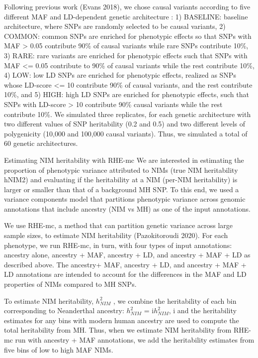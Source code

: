 Following previous work (Evans 2018), we chose causal variants according to five different MAF and LD-dependent genetic architecture : 1) BASELINE: baseline architecture, where SNPs are randomly selected to be causal variants, 2) COMMON: common SNPs are enriched for phenotypic effects so that SNPs with MAF > 0.05 contribute 90\% of causal variants while rare SNPs contribute 10\%, 3) RARE: rare variants are enriched for phenotypic effects such that SNPs with MAF <= 0.05 contribute to 90\% of causal variants while the rest contribute 10\%, 4) LOW: low LD SNPs are enriched for phenotypic effects, realized as SNPs whose LD-score <= 10 contribute 90\% of causal variants, and the rest contribute 10\%, and 5) HIGH: high LD SNPs are enriched for phenotypic effects, such that SNPs with LD-score > 10 contribute 90\% causal variants while the rest contribute 10\%. We simulated three replicates, for each genetic architecture with two different values of SNP heritability (0.2 and 0.5) and two different levels of polygenicity (10,000 and 100,000 causal variants). Thus, we simulated a total of 60 genetic architectures.

Estimating NIM heritability with RHE-mc
We are interested in estimating the proportion of phenotypic variance attributed to NIMs (true NIM heritability hNIM2) and evaluating if the heritability at a NIM (per-NIM heritability) is larger or smaller than that of a background MH SNP. To this end, we used a variance components model that partitions phenotypic variance across genomic annotations that include ancestry (NIM vs MH) as one of the input annotations.

We use RHE-mc, a method that can partition genetic variance across large sample sizes, to estimate NIM heritability (Pazokitoroudi 2020). For each phenotype, we run RHE-mc, in turn, with four types of input annotations: ancestry alone, ancestry + MAF, ancestry + LD, and ancestry + MAF + LD as described above. The ancestry+ MAF, ancestry + LD, and ancestry + MAF + LD annotations are intended to account for the differences in the MAF and LD properties of NIMs compared to MH SNPs.

To estimate NIM heritability, $h^2_{NIM}$ , we combine the heritability of each bin corresponding to Neanderthal ancestry:
$h^2_{NIM}$ = i$h^2_{NIM}$, i
and the heritability estimates for any bins with modern human ancestry are used to compute the total heritability from MH. Thus, when we estimate NIM heritability from RHE-mc run with ancestry + MAF annotations, we add the heritability estimates from five bins of low to high MAF NIMs.
 
